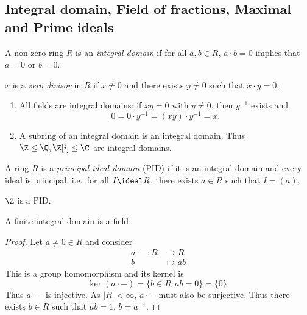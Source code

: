 \documentclass[a4paper]{article}
\theoremstyle{definition}
\begin{document}
\subsection{Integral domain, Field of fractions, Maximal and Prime ideals}

\begin{definition}
  A non-zero ring \(R\) is an \emph{integral domain} if for all \(a, b \in R\), \(a \cdot b = 0\) implies that \(a = 0\) or \(b = 0\).
\end{definition}

\begin{definition}
  \(x\) is a \emph{zero divisor} in \(R\) if \(x \neq 0\) and there exists \(y \neq 0\) such that \(x \cdot y = 0\).
\end{definition}

\begin{eg}\leavevmode
  \begin{enumerate}
  \item All fields are integral domains: if \(xy = 0\) with \(y \neq 0\), then \(y^{-1}\) exists and
    \[
      0 = 0 \cdot y^{-1} = (xy) \cdot y^{-1} = x.
    \]
  \item A subring of an integral domain is an integral domain. Thus \(\Z \leq \Q, \Z[i] \leq \C\) are integral domains.
  \end{enumerate}
\end{eg}

\begin{definition}
  A ring \(R\) is a \emph{principal ideal domain} (PID) if it is an integral domain and every ideal is principal, i.e.\ for all \(I \ideal R\), there exists \(a \in R\) such that \(I = (a)\).
\end{definition}

\begin{eg}
  \(\Z\) is a PID.
\end{eg}

\begin{lemma}
  A finite integral domain is a field.
\end{lemma}

\begin{proof}
  Let \(a \neq 0 \in R\) and consider
  \begin{align*}
    a \cdot -: R &\to R \\
    b &\mapsto ab
  \end{align*}
  This is a group homomorphism and its kernel is
  \[
    \ker (a \cdot -) = \{b \in R: ab = 0\} = \{0\}.
  \]
  Thus \(a \cdot -\) is injective. As \(|R| < \infty\), \(a \cdot -\) must also be surjective. Thus there exists \(b \in R\) such that \(ab = 1\). \(b = a^{-1}\).
\end{proof}
\end{document}
